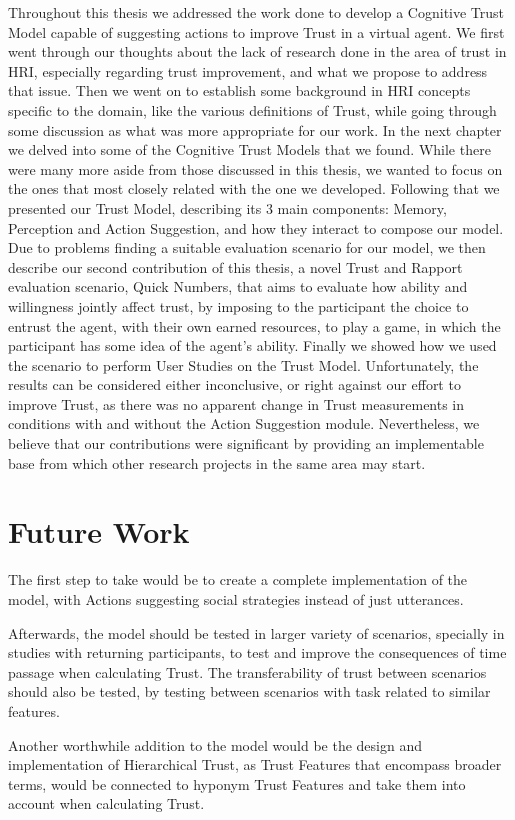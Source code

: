 \label{chap:Conclusions}
Throughout this thesis we addressed the work done to develop a Cognitive Trust Model capable of suggesting actions to improve Trust in a virtual agent. We first went through our thoughts about the lack of research done in the area of trust in \ac{HRI}, especially regarding trust improvement, and what we propose to address that issue. Then we went on to establish some background in \ac{HRI} concepts specific to the domain, like the various definitions of Trust, while going through some discussion as what was more appropriate for our work. In the next chapter we delved into some of the Cognitive Trust Models that we found. While there were many more aside from those discussed in this thesis, we wanted to focus on the ones that most closely related with the one we developed. Following that we presented our Trust Model, describing its 3 main components: Memory, Perception and Action Suggestion, and how they interact to compose our model. Due to problems finding a suitable evaluation scenario for our model, we then describe our second contribution of this thesis, a novel Trust and Rapport evaluation scenario, Quick Numbers, that aims to evaluate how ability and willingness jointly affect trust, by imposing to the participant the choice to entrust the agent, with their own earned resources, to play a game, in which the participant has some idea of the agent's ability. Finally we showed how we used the scenario to perform User Studies on the Trust Model. Unfortunately, the results can be considered either inconclusive, or right against our effort to improve Trust, as there was no apparent change in Trust measurements in conditions with and without the Action Suggestion module. Nevertheless, we believe that our contributions were significant by providing an implementable base from which other research projects in the same area may start. 


\section{Future Work}
The first step to take would be to create a complete implementation of the model, with Actions suggesting social strategies instead of just utterances. 

Afterwards, the model should be tested in larger variety of scenarios, specially in studies with returning participants, to test and improve the consequences of time passage when calculating Trust. The transferability of trust between scenarios should also be tested, by testing between scenarios with task related to similar features.

Another worthwhile addition to the model would be the design and implementation of Hierarchical Trust, as Trust Features that encompass broader terms, would be connected to hyponym Trust Features and take them into account when calculating Trust.